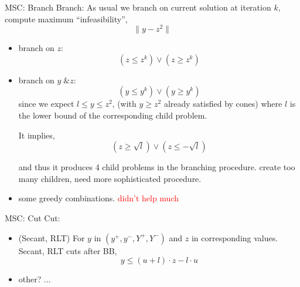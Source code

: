 \begin{frame}{MSC: Branch}
  Branch:
  As usual we branch on current solution at iteration \(k\), compute maximum ``infeasibility'',
  \[ \|y - z^2\|\]
  \begin{itemize}
    \item branch on \(z\):
          \[ \left(z \le z^k \right)  \vee \left(z \ge z^k \right)  \]
    \item branch on \(y\; \& z\):
          \[ \left(y \le y^k  \right)  \vee \left (y \ge y^k \right)  \]
          since we expect \(l \le y \le z^2\), (with \(y \ge z^2\) already satisfied by cones)
          where \(l\) is the lower bound of the corresponding child problem.

          It implies,
          \[
            \left(z \ge \sqrt{l} \right) \vee \left( z \le -\sqrt{l} \right)
          \]

          and thus it produces 4 child problems in the branching procedure.
          create too many children, need more sophisticated procedure.
    \item some greedy combinations. \textcolor{red}{didn't help much}
  \end{itemize}
\end{frame}

\begin{frame}{MSC: Cut}
  Cut:

  \begin{itemize}
    \item  (Secant, RLT) For \(y\) in \((y^+, y^-, Y^+, Y^-)\) and \(z\) in corresponding values.
          Secant, RLT cuts after BB,
          \[y\le (u + l) \cdot z - l \cdot u\]
    \item other? ...
  \end{itemize}
\end{frame}



